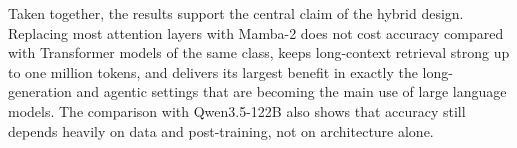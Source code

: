 Taken together, the results support the central claim of the hybrid design.
Replacing most attention layers with Mamba-2 does not cost accuracy compared
with Transformer models of the same class, keeps long-context retrieval strong
up to one million tokens, and delivers its largest benefit in exactly the
long-generation and agentic settings that are becoming the main use of large
language models. The comparison with Qwen3.5-122B also shows that accuracy
still depends heavily on data and post-training, not on architecture alone.
